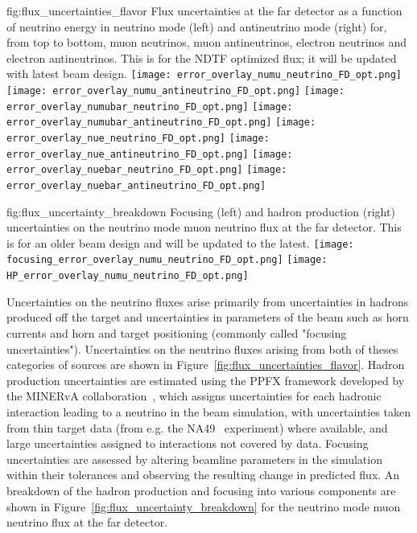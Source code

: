 \begin{dunefigure}{fig:flux_uncertainties_flavor}
{Flux uncertainties at the far detector as a function of neutrino energy in neutrino mode (left) and antineutrino mode (right) for, from top to bottom, muon neutrinos, muon antineutrinos, electron neutrinos and electron antineutrinos.   This is for the NDTF optimized flux; it will  be updated with latest beam design.   }
    \texttt{[image: error\_overlay\_numu\_neutrino\_FD\_opt.png]}
    \texttt{[image: error\_overlay\_numu\_antineutrino\_FD\_opt.png]}
    \texttt{[image: error\_overlay\_numubar\_neutrino\_FD\_opt.png]}
    \texttt{[image: error\_overlay\_numubar\_antineutrino\_FD\_opt.png]}
        \texttt{[image: error\_overlay\_nue\_neutrino\_FD\_opt.png]}
    \texttt{[image: error\_overlay\_nue\_antineutrino\_FD\_opt.png]}
        \texttt{[image: error\_overlay\_nuebar\_neutrino\_FD\_opt.png]}
    \texttt{[image: error\_overlay\_nuebar\_antineutrino\_FD\_opt.png]}
    \end{dunefigure}




\begin{dunefigure}{fig:flux_uncertainty_breakdown}
{Focusing (left) and hadron production (right) uncertainties on the neutrino mode muon neutrino flux at the far detector.  This is for an older beam design and will be updated to the latest.  }
\texttt{[image: focusing\_error\_overlay\_numu\_neutrino\_FD\_opt.png]}
    \texttt{[image: HP\_error\_overlay\_numu\_neutrino\_FD\_opt.png]}\end{dunefigure}

Uncertainties on the neutrino fluxes arise primarily from uncertainties in hadrons produced off the target and uncertainties in parameters of the beam such as horn currents and horn and target positioning (commonly called "focusing uncertainties").  Uncertainties on the neutrino fluxes arising from both of theses categories of sources are shown in Figure~\ref{fig:flux_uncertainties_flavor}.  Hadron production uncertainties are estimated using the PPFX framework developed by the MINERvA collaboration~\cite{Aliaga:2016oaz, AliagaSoplin:2016shs}, which assigns uncertainties for each hadronic interaction leading to a neutrino in the beam simulation, with uncertainties taken from thin target data (from e.g. the NA49~\cite{NA49} experiment) where available, and large uncertainties assigned to interactions not covered by data.  Focusing uncertainties are assessed by altering beamline parameters in the simulation within their tolerances and observing the resulting change in predicted flux.  An breakdown of the hadron production and focusing into various components are shown in Figure~\ref{fig:flux_uncertainty_breakdown} for the neutrino mode muon neutrino flux at the far detector.    

